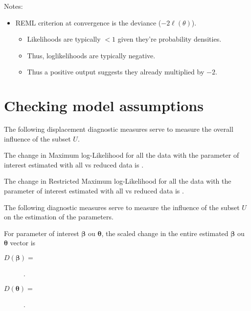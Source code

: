\documentclass[english]{article}
\begin{document}
\begin{multicols*}{2}
\bigskip

Notes:
\begin{itemize}
	\item	REML criterion at convergence is the deviance ($-2\ell(\theta)$).
		\begin{itemize}
		\item	Likelihoods are typically $<1$ given they're probability densities.
		\item	Thus, loglikelihoods are typically negative.
		\item	Thus a positive output suggests they already multiplied by $-2$.
		\end{itemize}
\end{itemize}



\section{Checking model assumptions}
The following displacement diagnostic measures serve to measure the overall influence of the subset $U$.

\begin{definitionNOHFILLsub}
The change in Maximum log-Likelihood for all the data with the parameter of interest \lfbox[conditions]{$\bm{\psi}$} estimated with all vs reduced data is .
\end{definitionNOHFILLsub}

\begin{definitionNOHFILLsub}
The change in Restricted Maximum log-Likelihood for all the data with the parameter of interest \lfbox[conditions]{$\bm{\psi}$} estimated with all vs reduced data is .
\end{definitionNOHFILLsub}

\bigskip

The following diagnostic measures serve to measure the influence of the subset $U$ on the estimation of the parameters.
\begin{definitionNOHFILLsub}[Cook's $D$]
For parameter of interest $\bm{\beta}$ ou $\bm{\theta}$, the scaled change in the entire estimated $\bm{\beta}$ ou $\bm{\theta}$ vector is
\begin{description}
	\item[$D(\bm{\beta}) =$]	.
	\item[$D(\bm{\theta}) =$]	.
\end{description}
\end{definitionNOHFILLsub}


\end{multicols*}
\end{document}
